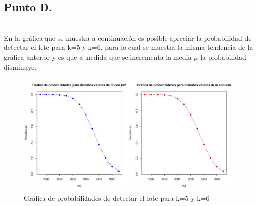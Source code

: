 \documentclass[letterpaper,12pt,onecolumn,titlepage]{article}
\begin{document}
\pagebreak \subsection{Punto D.}
~\\ En la gr\'{a}fica que se muestra a continuaci\'{o}n es posible apreciar la probabilidad de detectar el lote para k=5 y k=6, para lo cual se muestra la misma tendencia de la gr\'{a}fica anterior y es que a medida que se incrementa la media $\mu$ la probabilidad disminuye.
\begin{figure}[!h]
    \begin{center}
        \includegraphics[width=15cm]{Figuras/5d.jpeg}
        \caption{Gr\'{a}fica de probabilidades de detectar el lote para k=5 y k=6}
        \label{fig:Densidad}
    \end{center}
\end{figure}
\end{document}
